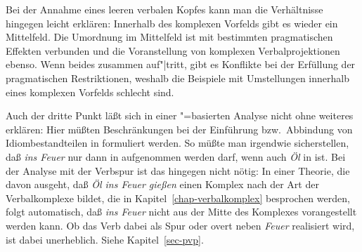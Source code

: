 Bei der Annahme eines leeren verbalen Kopfes kann man die Verhältnisse hingegen leicht erklären:
Innerhalb des komplexen Vorfelds gibt es wieder ein Mittelfeld.
Die Umordnung im Mittelfeld ist mit bestimmten pragmatischen Effekten verbunden und die Voranstellung
von komplexen Verbalprojektionen ebenso. Wenn beides zusammen auf"|tritt, gibt es Konflikte bei der
Erfüllung der pragmatischen Restriktionen, weshalb die Beispiele mit Umstellungen innerhalb eines
komplexen Vorfelds schlecht sind.

Auch der dritte Punkt läßt sich in einer \slasch"=basierten Analyse nicht ohne weiteres erklären:
Hier müßten Beschränkungen bei der Einführung bzw.\ Abbindung von Idiombestandteilen
in \slasch formuliert werden. So müßte man \zb irgendwie sicherstellen, daß \emph{ins Feuer} nur
dann in \slasch aufgenommen werden darf, wenn auch \emph{Öl} in \slasch ist.
Bei der Analyse mit der Verbspur ist das hingegen nicht nötig: In einer Theorie, die davon ausgeht, daß
\emph{Öl ins Feuer gießen} einen Komplex nach der Art der Verbalkomplexe bildet, die in
Kapitel~\ref{chap-verbalkomplex} besprochen werden, folgt automatisch, daß \emph{ins Feuer} nicht
aus der Mitte des Komplexes vorangestellt werden kann. Ob das Verb dabei als Spur oder overt neben
\emph{Feuer} realisiert wird, ist dabei unerheblich. Siehe Kapitel~\ref{sec-pvp}.



